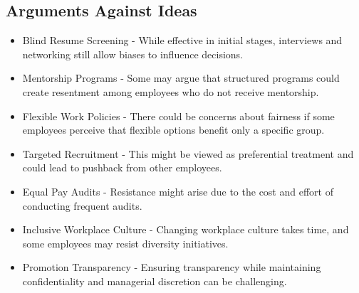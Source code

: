 \documentclass{article}
\begin{document}
\subsection{Arguments Against Ideas}
\begin{itemize}
    \item Blind Resume Screening - While effective in initial stages, interviews and networking still allow biases to influence decisions.
    \item Mentorship Programs - Some may argue that structured programs could create resentment among employees who do not receive mentorship.
    \item Flexible Work Policies - There could be concerns about fairness if some employees perceive that flexible options benefit only a specific group.
    \item Targeted Recruitment - This might be viewed as preferential treatment and could lead to pushback from other employees.
    \item Equal Pay Audits - Resistance might arise due to the cost and effort of conducting frequent audits.
    \item Inclusive Workplace Culture - Changing workplace culture takes time, and some employees may resist diversity initiatives.
    \item Promotion Transparency - Ensuring transparency while maintaining confidentiality and managerial discretion can be challenging.
\end{itemize}
\end{document}
